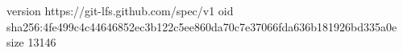 version https://git-lfs.github.com/spec/v1
oid sha256:4fe499c4c44646852ec3b122c5ee860da70c7e37066fda636b181926bd335a0e
size 13146
